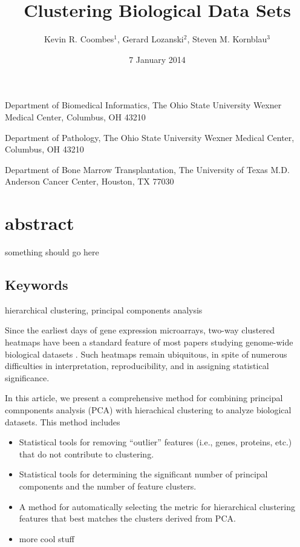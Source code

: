 \documentclass{nature}
\title{Clustering Biological Data Sets}
\author{Kevin R. Coombes$^1$, Gerard Lozanski$^2$, Steven M. Kornblau$^3$}
\date{7 January 2014}
\begin{document}
\maketitle
\begin{affiliations}
\item Department of Biomedical Informatics, The Ohio State University
  Wexner Medical Center, Columbus, OH 43210
\item Department of Pathology, The Ohio State University Wexner
  Medical Center, Columbus, OH 43210
\item Department of Bone Marrow Transplantation, The University of
  Texas M.D. Anderson Cancer Center, Houston, TX 77030
\end{affiliations}

\section{abstract}
something should go here
\subsection{Keywords}

hierarchical clustering, principal components analysis

Since the earliest days of gene expression microarrays, two-way
clustered heatmaps have been a standard feature of most papers
studying genome-wide biological datasets \cite{weinstein97,eisen98}.
Such heatmaps remain ubiquitous, in spite of numerous difficulties in
interpretation, reproducibility, and in assigning statistical
significance.

In this article, we present a comprehensive method for combining
principal comnponents analysis (PCA) with hierachical clustering to
analyze biological datasets. This method includes
\begin{itemize}
\item Statistical tools for removing ``outlier'' features (i.e.,
  genes, proteins, etc.) that do not contribute to clustering.
\item Statistical tools for determining the significant number of
  principal components and the number of feature clusters.
\item A method for automatically selecting the metric for hierarchical
  clustering features that best matches the clusters derived from PCA.
\item more cool stuff
\end{itemize}
\end{document}
